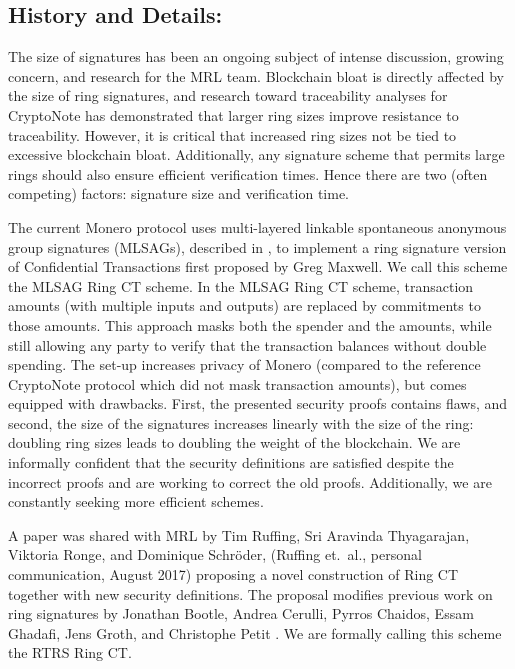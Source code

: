 \documentclass[12pt,english]{mrl}
\theoremstyle{definition}
\numberwithin{equation}{section}
\numberwithin{figure}{section}
\numberwithin{equation}{section}
\numberwithin{equation}{section}
\numberwithin{figure}{section}
\begin{document}
\subsection{History and Details:} 

The size of signatures has been an ongoing subject of intense discussion, growing concern, and research for the MRL team. Blockchain bloat is directly affected by the size of ring signatures, and research toward traceability analyses for CryptoNote has demonstrated that larger ring sizes improve resistance to traceability. However, it is critical that increased ring sizes not be tied to excessive blockchain bloat. Additionally, any signature scheme that permits large rings should also ensure efficient verification times. Hence there are two (often competing) factors: signature size and verification time.

The current Monero protocol uses multi-layered linkable spontaneous anonymous group signatures (MLSAGs), described in \cite{noether2016ring}, to implement a ring signature version of Confidential Transactions first proposed by Greg Maxwell. We call this scheme the MLSAG Ring CT scheme. In the MLSAG Ring CT scheme, transaction amounts (with multiple inputs and outputs) are replaced by commitments to those amounts. This approach masks both the spender and the amounts, while still allowing any party to verify that the transaction balances without double spending. The set-up increases privacy of Monero (compared to the reference CryptoNote protocol which did not mask transaction amounts), but comes equipped with drawbacks. First, the presented security proofs contains flaws, and second, the size of the signatures increases linearly with the size of the ring: doubling ring sizes leads to doubling the weight of the blockchain.  We are informally confident that the security definitions are satisfied despite the incorrect proofs and are working to correct the old proofs. Additionally, we are constantly seeking more efficient schemes.

A paper was shared with MRL by Tim Ruffing, Sri Aravinda Thyagarajan, Viktoria Ronge, and Dominique Schr{\"o}der, (Ruffing et.\ al., personal communication, August 2017) proposing a novel construction of Ring CT together with new security definitions. The proposal modifies previous work on ring signatures by Jonathan Bootle, Andrea Cerulli, Pyrros Chaidos, Essam Ghadafi, Jens Groth, and Christophe Petit \cite{bootle2015short}. We are formally calling this scheme the RTRS Ring CT.  
\end{document}
